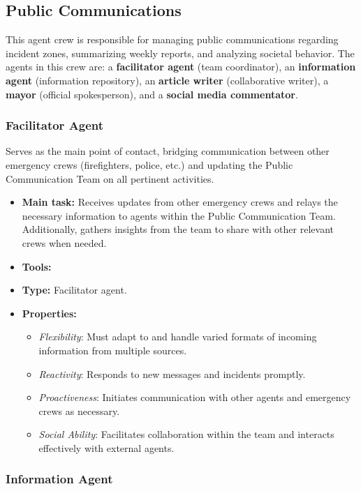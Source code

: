 \subsection{Public Communications}

This agent crew is responsible for managing public communications regarding incident zones, summarizing weekly reports, and analyzing societal behavior. The agents in this crew are: a \textbf{facilitator agent} (team coordinator), an \textbf{information agent} (information repository), an \textbf{article writer} (collaborative writer), a \textbf{mayor} (official spokesperson), and a \textbf{social media commentator}.

\subsubsection{Facilitator Agent}

Serves as the main point of contact, bridging communication between other emergency crews (firefighters, police, etc.) and updating the Public Communication Team on all pertinent activities.

\begin{itemize}
    \item \textbf{Main task:} Receives updates from other emergency crews and relays the necessary information to agents within the Public Communication Team. Additionally, gathers insights from the team to share with other relevant crews when needed.
    \item \textbf{Tools:} 
    \item \textbf{Type:} Facilitator agent.
    \item \textbf{Properties:}
    \begin{itemize}
        \item \emph{Flexibility}: Must adapt to and handle varied formats of incoming information from multiple sources.
        \item \emph{Reactivity}: Responds to new messages and incidents promptly.
        \item \emph{Proactiveness}: Initiates communication with other agents and emergency crews as necessary.
        \item \emph{Social Ability}: Facilitates collaboration within the team and interacts effectively with external agents.
    \end{itemize}
\end{itemize}

\subsubsection{Information Agent}

